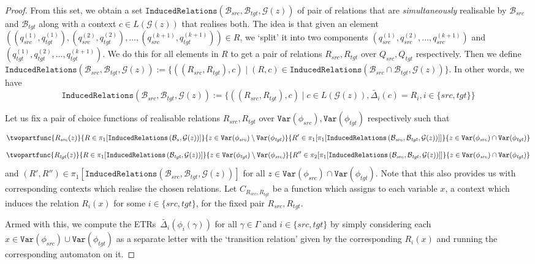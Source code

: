 \documentclass[12pt, a4paper]{article}
\newcommand{\extendedTransitionRelation}{ETR}
\newcommand{\Variables}{\texttt{Var}}
\newcommand{\Transitions}{\ensuremath{\Delta}}
\newcommand{\RealisableRelations}[2]{\ensuremath{\texttt{InducedRelations}\left(#1, #2\right)}}
\newcommand{\automatonB}{\ensuremath{\mathcal{B}}}
\newcommand{\guardFunction}{\ensuremath{\mathcal{G}}}
\newcommand{\guard}[1]{\ensuremath{\guardFunction(#1)}}
\newcommand{\src}{\mathit{src}}
\newcommand{\sourceAutomatonB}{\ensuremath{\automatonB_{\src}}}
\newcommand{\sourceMap}{\ensuremath{\phi_{\src}}}
\newcommand{\tgt}{\mathit{tgt}}
\newcommand{\targetAutomatonB}{\ensuremath{\automatonB_{\tgt}}}
\newcommand{\targetMap}{\ensuremath{\phi_{\tgt}}}
\begin{document}
\begin{proof}
    From this set, we obtain a set $\RealisableRelations{\sourceAutomatonB, \targetAutomatonB}{\guard{z}}$ of pair of relations that are \emph{simultaneously} realisable by $\sourceAutomatonB$ and $\targetAutomatonB$ along with a context $c \in L(\guard{z})$ that realises both. The idea  is that given an element $((q_\src^{(1)}, q_\tgt^{(1)}), (q_\src^{(2)}, q_\tgt^{(2)}), \dots, (q_\src^{(k+1)}, q_\tgt^{(k+1)})) \in R$, we `split' it into two components $(q_\src^{(1)}, q_\src^{(2)}, \dots, q_\src^{(k+1)})$ and $(q_\tgt^{(1)}, q_\tgt^{(2)}, \dots, q_\tgt^{(k+1)})$. We do this for all elements in $R$ to get a pair of relations $R_\src, R_\tgt$ over $Q_\src, Q_\tgt$ respectively. Then we define $\RealisableRelations{\sourceAutomatonB, \targetAutomatonB}{\guard{z}} := \{((R_\src, R_\tgt), c) \mid (R, c) \in \RealisableRelations{\sourceAutomatonB \cap \targetAutomatonB}{\guard{z}}\}$. In other words, we have
    \[ \RealisableRelations{\sourceAutomatonB, \targetAutomatonB}{\guard{z}} := \{((R_\src, R_\tgt), c) \mid c \in L(\guard{z}), \widetilde{\Transitions_i}(c) = R_i, i \in \{\src, \tgt\}\} \]

    Let us fix a pair of choice functions of realisable relations $R_\src, R_\tgt$ over $\Variables(\sourceMap), \Variables(\targetMap)$ respectively such that
    \[ \twopartfunc{R_\src(z)}{R \in \pi_1[\RealisableRelations{\automatonB_s}{\guard{z}}]}{z \in \Variables(\sourceMap) \setminus \Variables(\targetMap)}{R' \in \pi_1[\pi_1[\RealisableRelations{\sourceAutomatonB, \targetAutomatonB}{\guard{z}}]]}{z \in \Variables(\sourceMap) \cap \Variables(\targetMap)} \]
    \[ \twopartfunc{R_\tgt(z)}{R \in \pi_1[\RealisableRelations{\targetAutomatonB}{\guard{z}}]}{z \in \Variables(\targetMap) \setminus \Variables(\sourceMap)}{R'' \in \pi_2[\pi_1[\RealisableRelations{\sourceAutomatonB, \targetAutomatonB}{\guard{z}}]]}{z \in \Variables(\sourceMap) \cap \Variables(\targetMap)} \]
    and $(R', R'') \in \pi_1[\RealisableRelations{\sourceAutomatonB, \targetAutomatonB}{\guard{z}}]$ for all $z \in \Variables(\sourceMap) \cap \Variables(\targetMap)$. Note that this also provides us with corresponding contexts which realise the chosen relations. Let $C_{R_\src, R_\tgt}$ be a function which assigns to each variable $x$, a context which induces the relation $R_i(x)$ for some $i \in \{\src, \tgt\}$, for the fixed pair $R_\src, R_\tgt$.

    Armed with this, we compute the \extendedTransitionRelation s\ $\widetilde{\Transitions_i}(\phi_i(\gamma))$ for all $\gamma \in \Gamma$ and $i \in \{\src, \tgt\}$ by simply considering each $x \in \Variables(\sourceMap) \cup \Variables(\targetMap)$ as a separate letter with the `transition relation' given by the corresponding $R_i(x)$ and running the corresponding automaton on it.


\end{proof}
\end{document}
